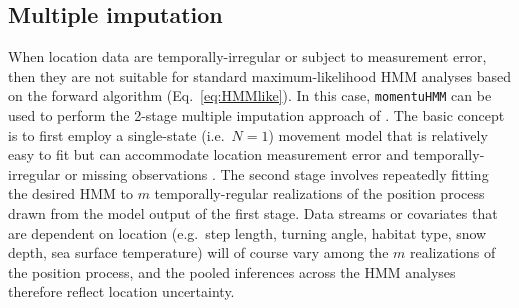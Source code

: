 \documentclass[12pt]{article}\usepackage[]{graphicx}\usepackage[]{color}
\begin{document}
\subsection{Multiple imputation}
\label{sec:mi}
When location data are temporally-irregular or subject to measurement error, then they are not suitable for standard maximum-likelihood HMM analyses based on the forward algorithm (Eq.\ \ref{eq:HMMlike}). In this case, \verb|momentuHMM| can be used to perform the 2-stage multiple imputation approach of \cite{McClintock2017}. The basic concept is to first employ a single-state (i.e.\ $N=1$) movement model that is relatively easy to fit but can accommodate location measurement error and temporally-irregular or missing observations \citep[e.g.][]{JohnsonEtAl2008}. The second stage involves repeatedly fitting the desired HMM to $m$ temporally-regular realizations of the position process drawn from the model output of the first stage.  Data streams or covariates that are dependent on location (e.g.\ step length, turning angle, habitat type, snow depth, sea surface temperature) will of course vary among the $m$ realizations of the position process, and the pooled inferences across the HMM analyses therefore reflect location uncertainty.  
\end{document}
